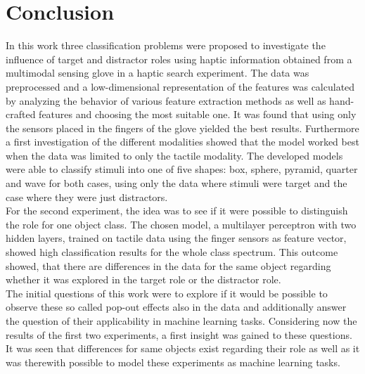 
\chapter{Conclusion} %

\label{Conclusion} %
In this work three classification problems were proposed to investigate the influence of target and distractor roles using haptic information obtained from a multimodal sensing glove in a haptic search experiment. The data was preprocessed and a low-dimensional representation of the features was calculated by analyzing the behavior of various feature extraction methods as well as hand-crafted features and choosing the most suitable one. It was found that using only the sensors placed in the fingers of the glove yielded the best results. Furthermore a first investigation of the different modalities showed that the model worked best when the data was limited to only the tactile modality. The developed models were able to classify stimuli into one of five shapes: box, sphere, pyramid, quarter and wave for both cases, using only the data where stimuli were target and the case where they were just distractors. \\
For the second experiment, the idea was to see if it were possible to distinguish the role for one object class. The chosen model, a multilayer perceptron with two hidden layers, trained on tactile data using the finger sensors as feature vector, showed high classification results for the whole class spectrum. This outcome showed, that there are differences in the data for the same object regarding whether it was explored in the target role or the distractor role. \\
The initial questions of this work were to explore if it would be possible to observe these so called pop-out effects also in the data and additionally answer the question of their applicability in machine learning tasks. Considering now the results of the first two experiments, a first insight was gained to these questions. It was seen that differences for same objects exist regarding their role as well as it was therewith possible to model these experiments as machine learning tasks.\\

